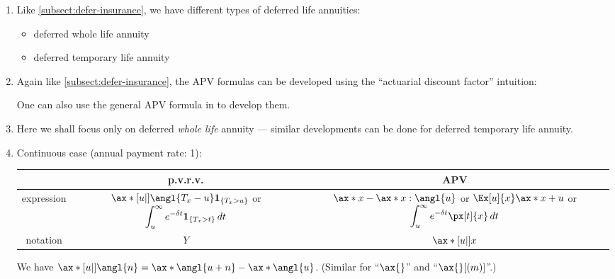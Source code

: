 \begin{enumerate}
\item Like \cref{subsect:defer-insurance}, we have different types of deferred life annuities:
\begin{itemize}
\item deferred whole life annuity
\item deferred temporary life annuity
\end{itemize}
\item Again like \cref{subsect:defer-insurance}, the APV formulas can be
developed using the ``actuarial discount factor'' intuition:


One can also use the general APV formula in  to
develop them.
\item Here we shall focus only on deferred \emph{whole life} annuity ---
similar developments can be done for deferred temporary life annuity.
\item \label{it:cts-defer-wl-annuity-fmlas}
Continuous case (annual payment rate: 1):

\begin{tabular}{ccc}
\toprule
&p.v.r.v.&APV \\
\midrule
expression&\(\ax*[u|]{\angl{T_x-u}}\indicset{T_x>u}\) or \(\displaystyle\int_{u}^{\infty}e^{-\delta t}\mathbf{1}_{\left\{T_x>t\right\}}\,dt\)
&\makecell{\(\ax*{x}-\ax*{x:\angl{u}}\) or 
\(\Ex[u]{x}\ax*{x+u}\)\\
or \(\displaystyle\int_{u}^{\infty}e^{-\delta t}\px[t]{x}\,dt\)} \\
notation&\(Y\)&\(\ax*[u|]{x}\)\\
\bottomrule
\end{tabular}

\begin{note}
We have \(\ax*[u|]{\angl{n}}=\ax*{\angl{u+n}}-\ax*{\angl{u}}\). (Similar for
``\(\ax{}\)'' and ``\(\ax{}[(m)]\)''.)
\end{note}


\end{enumerate}
